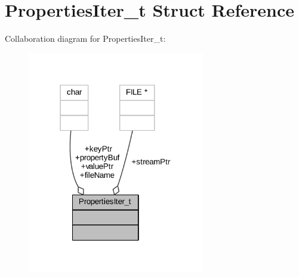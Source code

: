 \hypertarget{struct_properties_iter__t}{}\section{Properties\+Iter\+\_\+t Struct Reference}
\label{struct_properties_iter__t}


Collaboration diagram for Properties\+Iter\+\_\+t\+:
\nopagebreak
\begin{figure}[H]
\begin{center}
\leavevmode
\includegraphics[width=219pt]{struct_properties_iter__t__coll__graph}
\end{center}
\end{figure}
